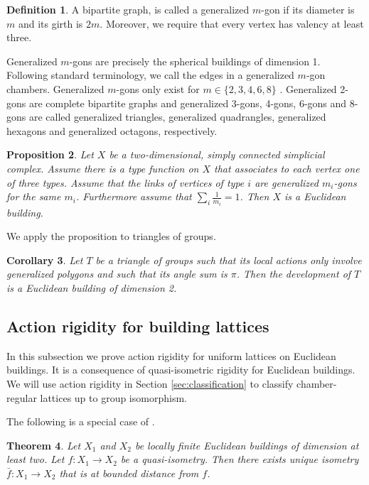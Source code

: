 \documentclass[dvipsnames]{article}
\newtheorem{theorem}{Theorem}
\newtheorem{corollary}[theorem]{Corollary}
\newtheorem{proposition}[theorem]{Proposition}
\theoremstyle{definition}
\newtheorem{definition}[theorem]{Definition}
\theoremstyle{remark}
\begin{document}
    \begin{definition}
        A bipartite graph, is called a generalized $m$-gon if its diameter is $m$ and its girth is $2m$. Moreover, we require that every vertex has valency at least three.
    \end{definition}

    Generalized $m$-gons are precisely the spherical buildings of dimension 1. 
    Following standard terminology, we call the edges in a generalized $m$-gon chambers.
    Generalized $m$-gons only exist for $m \in \{2,3,4,6,8\}$ \cite{FeitHigman}. Generalized 2-gons are complete bipartite graphs and generalized 3-gons, 4-gons, 6-gons and 8-gons are called generalized triangles, generalized quadrangles, generalized hexagons and generalized octagons, respectively.

    \begin{proposition}\label{prop:local_approach}
        Let $X$ be a two-dimensional, simply connected simplicial complex.
        Assume there is a type function on $X$ that associates to each vertex one of three types. Assume that the links of vertices of type $i$ are generalized $m_i$-gons for the same $m_i$. Furthermore assume that $\sum_i \frac 1 {m_i} = 1$. Then $X$ is a Euclidean building.
    \end{proposition}

    We apply the proposition to triangles of groups.

    \begin{corollary}
        Let $T$ be a triangle of groups such that its local actions only involve generalized polygons and such that its angle sum is $\pi$. Then the development of $T$ is a Euclidean building of dimension 2.
    \end{corollary}

    \subsection{Action rigidity for building lattices}

    In this subsection we prove action rigidity for uniform lattices on Euclidean buildings. It is a consequence of quasi-isometric rigidity for Euclidean buildings. We will use action rigidity in Section \ref{sec:classification} to classify chamber-regular lattices up to group isomorphism.

    The following is a special case of \cite[Theorem III]{KramerWeiss14}.

    \begin{theorem}\label{thm:qi_rigidity}
        Let $X_1$ and $X_2$ be locally finite Euclidean buildings of dimension at least two. Let $f : X_1 \to X_2$ be a quasi-isometry. Then there
        exists unique isometry $\bar f:X_1 \to X_2$ that is at bounded distance from $f$.
    \end{theorem}
\end{document}
